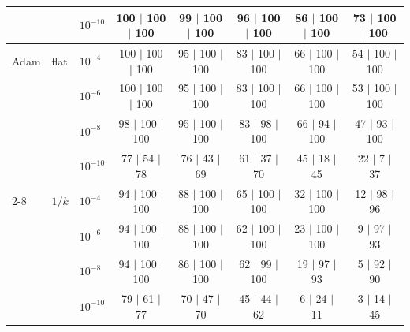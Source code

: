 \begin{tabular}{lllccccc}
 &  & $10^{-10}$ & 100 $|$ 100 $|$ 100 & 99 $|$ 100 $|$ 100 & 96 $|$ 100 $|$ 100 & 86 $|$ 100 $|$ 100 & 73 $|$ 100 $|$ 100 \\
\midrule
Adam & flat & $10^{-4}$ & 100 $|$ 100 $|$ 100 & 95 $|$ 100 $|$ 100 & 83 $|$ 100 $|$ 100 & 66 $|$ 100 $|$ 100 & 54 $|$ 100 $|$ 100 \\
 &  & $10^{-6}$ & 100 $|$ 100 $|$ 100 & 95 $|$ 100 $|$ 100 & 83 $|$ 100 $|$ 100 & 66 $|$ 100 $|$ 100 & 53 $|$ 100 $|$ 100 \\
 &  & $10^{-8}$ & 98 $|$ 100 $|$ 100 & 95 $|$ 100 $|$ 100 & 83 $|$ 98 $|$ 100 & 66 $|$ 94 $|$ 100 & 47 $|$ 93 $|$ 100 \\
 &  & $10^{-10}$ & 77 $|$ 54 $|$ 78 & 76 $|$ 43 $|$ 69 & 61 $|$ 37 $|$ 70 & 45 $|$ 18 $|$ 45 & 22 $|$ 7 $|$ 37 \\
\cmidrule(l){2-8}
 & $1/k$ & $10^{-4}$ & 94 $|$ 100 $|$ 100 & 88 $|$ 100 $|$ 100 & 65 $|$ 100 $|$ 100 & 32 $|$ 100 $|$ 100 & 12 $|$ 98 $|$ 96 \\
 &  & $10^{-6}$ & 94 $|$ 100 $|$ 100 & 88 $|$ 100 $|$ 100 & 62 $|$ 100 $|$ 100 & 23 $|$ 100 $|$ 100 & 9 $|$ 97 $|$ 93 \\
 &  & $10^{-8}$ & 94 $|$ 100 $|$ 100 & 86 $|$ 100 $|$ 100 & 62 $|$ 99 $|$ 100 & 19 $|$ 97 $|$ 93 & 5 $|$ 92 $|$ 90 \\
 &  & $10^{-10}$ & 79 $|$ 61 $|$ 77 & 70 $|$ 47 $|$ 70 & 45 $|$ 44 $|$ 62 & 6 $|$ 24 $|$ 11 & 3 $|$ 14 $|$ 45 \\
\bottomrule
\end{tabular}
